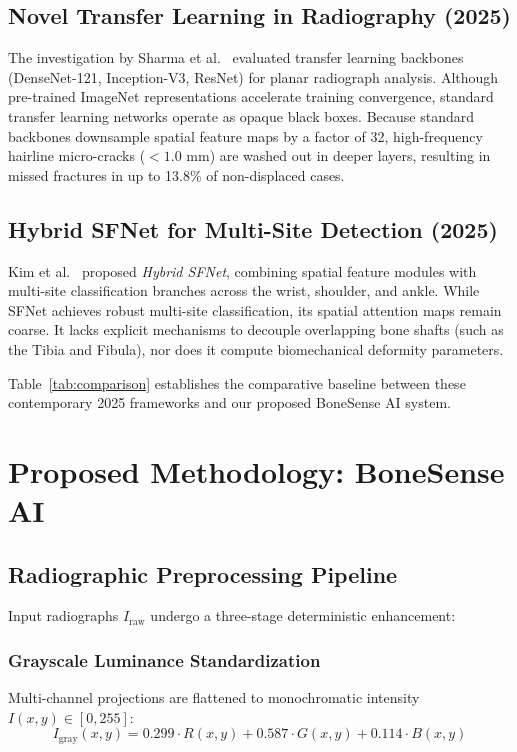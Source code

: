 \documentclass[3p,twocolumn]{elsarticle}
\begin{document}
\subsection{Novel Transfer Learning in Radiography (2025)}
The investigation by Sharma et al.~\cite{noveltransfer2025} evaluated transfer learning backbones (DenseNet-121, Inception-V3, ResNet) for planar radiograph analysis. Although pre-trained ImageNet representations accelerate training convergence, standard transfer learning networks operate as opaque black boxes. Because standard backbones downsample spatial feature maps by a factor of 32, high-frequency hairline micro-cracks ($< 1.0\text{ mm}$) are washed out in deeper layers, resulting in missed fractures in up to 13.8\% of non-displaced cases.

\subsection{Hybrid SFNet for Multi-Site Detection (2025)}
Kim et al.~\cite{sfnet2025} proposed \textit{Hybrid SFNet}, combining spatial feature modules with multi-site classification branches across the wrist, shoulder, and ankle. While SFNet achieves robust multi-site classification, its spatial attention maps remain coarse. It lacks explicit mechanisms to decouple overlapping bone shafts (such as the Tibia and Fibula), nor does it compute biomechanical deformity parameters.

Table~\ref{tab:comparison} establishes the comparative baseline between these contemporary 2025 frameworks and our proposed BoneSense AI system.

\section{Proposed Methodology: BoneSense AI}

\subsection{Radiographic Preprocessing Pipeline}
Input radiographs $I_{\text{raw}}$ undergo a three-stage deterministic enhancement:

\subsubsection{Grayscale Luminance Standardization}
Multi-channel projections are flattened to monochromatic intensity $I(x, y) \in [0, 255]$:
\begin{equation}
    I_{\text{gray}}(x, y) = 0.299 \cdot R(x,y) + 0.587 \cdot G(x,y) + 0.114 \cdot B(x,y)
\end{equation}
\end{document}

